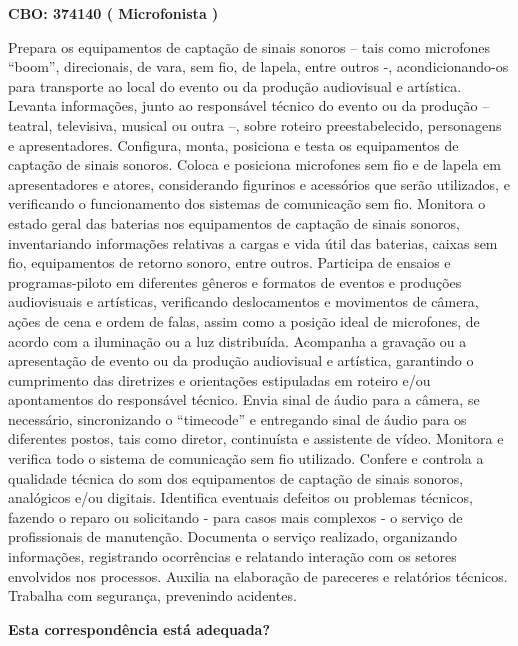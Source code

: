 \documentclass[
]{article}
\begin{document}
\textbf{CBO: 374140  ( Microfonista )}

Prepara os equipamentos de captação de sinais sonoros -- tais como
microfones ``boom'', direcionais, de vara, sem fio, de lapela, entre
outros -, acondicionando-os para transporte ao local do evento ou da
produção audiovisual e artística. Levanta informações, junto ao
responsável técnico do evento ou da produção -- teatral, televisiva,
musical ou outra --, sobre roteiro preestabelecido, personagens e
apresentadores. Configura, monta, posiciona e testa os equipamentos de
captação de sinais sonoros. Coloca e posiciona microfones sem fio e de
lapela em apresentadores e atores, considerando figurinos e acessórios
que serão utilizados, e verificando o funcionamento dos sistemas de
comunicação sem fio. Monitora o estado geral das baterias nos
equipamentos de captação de sinais sonoros, inventariando informações
relativas a cargas e vida útil das baterias, caixas sem fio,
equipamentos de retorno sonoro, entre outros. Participa de ensaios e
programas-piloto em diferentes gêneros e formatos de eventos e produções
audiovisuais e artísticas, verificando deslocamentos e movimentos de
câmera, ações de cena e ordem de falas, assim como a posição ideal de
microfones, de acordo com a iluminação ou a luz distribuída. Acompanha a
gravação ou a apresentação de evento ou da produção audiovisual e
artística, garantindo o cumprimento das diretrizes e orientações
estipuladas em roteiro e/ou apontamentos do responsável técnico. Envia
sinal de áudio para a câmera, se necessário, sincronizando o
``timecode'' e entregando sinal de áudio para os diferentes postos, tais
como diretor, continuísta e assistente de vídeo. Monitora e verifica
todo o sistema de comunicação sem fio utilizado. Confere e controla a
qualidade técnica do som dos equipamentos de captação de sinais sonoros,
analógicos e/ou digitais. Identifica eventuais defeitos ou problemas
técnicos, fazendo o reparo ou solicitando - para casos mais complexos -
o serviço de profissionais de manutenção. Documenta o serviço realizado,
organizando informações, registrando ocorrências e relatando interação
com os setores envolvidos nos processos. Auxilia na elaboração de
pareceres e relatórios técnicos. Trabalha com segurança, prevenindo
acidentes.

\begin{Form}
\textbf{Esta correspondência está adequada?} \\ 
\end{Form}
\end{document}
